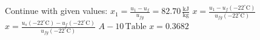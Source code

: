 Continue with given values:  
\( x_{1} = \frac{u_{1} - u_{f}}{u_{fg}} = 82.70 \, \frac{\text{kJ}}{\text{kg}} \)  
\( x = \frac{u_{1} - u_{f}(-22^\circ \text{C})}{u_{fg}(-22^\circ \text{C})} \)  
\( x = \frac{u_{s}(-22^\circ \text{C}) - u_{f}(-22^\circ \text{C})}{u_{fg}(-22^\circ \text{C})} \)  
\( A-10 \, \text{Table} \)  
\( x = 0.3682 \)
